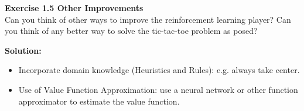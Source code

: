 \textbf{Exercise 1.5 Other Improvements} \\
Can you think of other ways to improve the reinforcement learning player? Can you think of any better way to solve the tic-tac-toe problem
as posed?

\textbf{Solution:}
\begin{itemize}
    \item Incorporate domain knowledge (Heuristics and Rules): e.g. always take center.
    \item Use of Value Function Approximation: use a neural network or other function approximator to estimate the value function.
\end{itemize}